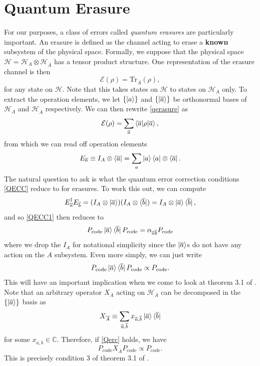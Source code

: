 \documentclass[12pt,a4paper]{report}
\numberwithin{equation}{section}
\newcommand{\ketbra}[2]{\ket{#1}\bra{#2}}
\newcommand{\ketbras}[1]{\ketbra{#1}{#1}}
\newcommand{\Pc}{P_{\text{code}}}
\newcommand{\ol}[1]{\overline{#1}}
\theoremstyle{definition}
\theoremstyle{theorem}
\theoremstyle{theorem}
\theoremstyle{example}
\theoremstyle{definition}
\begin{document}
\section{Quantum Erasure}
For our purposes, a class of errors called \textit{quantum erasures} are particularly important. An erasure is defined as the channel acting to erase a \textbf{known} subsystem of the physical space. Formally, we suppose that the physical space $\mathcal{H}=\mathcal{H}_{A}\otimes\mathcal{H}_{\ol{A}}$ has a tensor product structure. One representation of the erasure channel is then 
\begin{equation}\label{qerasure}
	\mathcal{E}(\rho)=\text{Tr}_{\ol{A}}(\rho),
\end{equation} 
for any state on $\mathcal{H}$. Note that this takes states on $\mathcal{H}$ to states on $\mathcal{H}_{A}$ only. To extract the operation elements, we let $\{\ket{a}\}$ and $\{\ket{\ol{a}}\}$ be orthonormal bases of $\mathcal{H}_{A}$ and $\mathcal{H}_{\ol{A}}$ respectively. We can then rewrite \ref{qerasure} as
\begin{equation}
	\mathcal{E}(\rho)=\sum_{\ol{a}}\braket{\ol{a}|\rho|\ol{a}},
\end{equation}
from which we can read off operation elements
\begin{equation}
	E_{\ol{a}}\equiv I_{A}\otimes\bra{\ol{a}}=\sum_{a}\ketbras{a}\otimes\bra{\ol{a}}.
\end{equation}
The natural question to ask is what the quantum error correction conditions \ref{QECC} reduce to for erasures. To work this out, we can compute
\begin{equation}
	E_{\ol{a}}^{\dagger}E_{\ol{b}}=(I_{A}\otimes\ket{\ol{a}})(I_{A}\otimes\bra{\ol{b}})=I_{A}\otimes\ketbra{\ol{a}}{\ol{b}},
\end{equation}
and so \ref{QECC1} then reduces to
\begin{equation}\label{Qerc}
	\Pc\ketbra{\ol{a}}{\ol{b}}\Pc=\alpha_{\ol{a}\ol{b}}\Pc
\end{equation}
where we drop the $I_{A}$ for notational simplicity since the $\ket{\ol{a}}$s do not have any action on the $A$ subsystem. Even more simply, we can just write
\begin{equation}
	\Pc\ketbra{\ol{a}}{\ol{b}}\Pc\propto\Pc.
\end{equation}
This will have an important implication when we come to look at theorem 3.1 of \cite{Harlow}. Note that an arbitrary operator $X_{\ol{A}}$ acting on $\mathcal{H}_{\ol{A}}$ can be decomposed in the $\{\ket{\ol{a}}\}$ basis as
\begin{equation}
	X_{\ol{A}}\equiv \sum_{\ol{a},\ol{b}}x_{\ol{a},\ol{b}}\ketbra{\ol{a}}{\ol{b}}
\end{equation}
for some $x_{\ol{a},\ol{b}}\in\mathbb{C}$. Therefore, if \ref{Qerc} holds, we have
\begin{equation}\label{EC}
	\Pc X_{\ol{A}}\Pc\propto\Pc.
\end{equation}
This is precisely condition 3 of theorem 3.1 of \cite{Harlow}.
\end{document}
